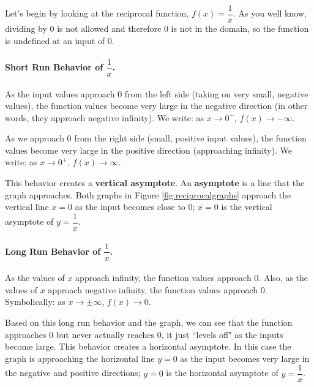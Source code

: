 Let's begin by looking at the reciprocal function, $f(x)=\dfrac{1}{x}$. As you well know, dividing by 0 is not allowed and therefore 0 is not in the domain, so the function is undefined at an input of 0.

\paragraph*{Short Run Behavior of $\dfrac{1}{x}$.}
As the input values approach 0 from the left side (taking on very small, negative values), the function values become very large in the negative direction (in other words, they approach negative infinity). We write: as $x\to 0^-$, $f(x)\to -\infty$.

As we approach 0 from the right side (small, positive input values), the function values become very large in the positive direction (approaching infinity). We write: as $x\to 0^+$, $f(x)\to\infty$.

This behavior creates a {\bf vertical asymptote}. An {\bf asymptote} is a line that the graph approaches. Both graphs in Figure \ref{fig:reciprocalgraphs} approach the vertical line $x=0$ as the input becomes close to 0; $x=0$ is the vertical asymptote of $y=\dfrac{1}{x}$.

\paragraph*{Long Run Behavior of $\dfrac{1}{x}$.}
As the values of $x$ approach infinity, the function values approach 0. Also, as the values of $x$ approach negative infinity, the function values approach 0. Symbolically: as $x\to\pm\infty$, $f(x)\to 0$.

Based on this long run behavior and the graph, we can see that the function approaches 0 but never actually reaches 0, it just ``levels off" as the inputs become large. This behavior creates a horizontal asymptote. In this case the graph is approaching the horizontal line $y=0$ as the input becomes very large in the negative and positive directions; $y=0$ is the horizontal asymptote of $y=\dfrac{1}{x}$.

